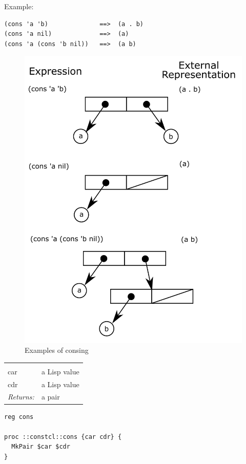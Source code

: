 \documentclass[twoside,9pt]{report}
\begin{document}
Example:

\begin{verbatim}
(cons 'a 'b)              ==>  (a . b)
(cons 'a nil)             ==>  (a)
(cons 'a (cons 'b nil))   ==>  (a b)
\end{verbatim}
\begin{figure}[h!]\includegraphics{images/consing.png}\captionsetup{labelformat=empty}\caption{ Examples of consing}\label{fig:-examples-of-consing}\end{figure}
\noindent\begin{tabular}{ |p{1.9cm} p{8cm}| }
\hline
\rowcolor[HTML]{CCCCCC} \multicolumn{2}{|l|}{\bf cons (public)} \\
car & a Lisp value \\
cdr & a Lisp value \\
\textit{Returns:} & a pair \\
\hline
\end{tabular}
\begin{lstlisting}
reg cons

proc ::constcl::cons {car cdr} {
  MkPair $car $cdr
}
\end{lstlisting}
\end{document}

